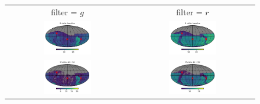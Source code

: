 \documentclass[preprintm,linenumbers]{aastex631}
\begin{document}
\begin{figure}
   		\centering
			\begin{tabular}{c c}
          filter = $g$ &  filter = $r$\\
   		\includegraphics[width=0.4\textwidth]{results/skymaps_cutout/skymaps_cutout_first_year_one_snap_v4_0_10yrs_db_noDD_noTwi_nside-256_CountMetric_g_noDD_noTwi.pdf} &
   		\includegraphics[width=0.4\textwidth]{results/skymaps_cutout/skymaps_cutout_first_year_one_snap_v4_0_10yrs_db_noDD_noTwi_nside-256_CountMetric_r_noDD_noTwi.pdf} \\

         \includegraphics[width=0.4\textwidth]{results/skymaps_cutout/skymaps_cutout_first_year_one_snap_v4_0_10yrs_db_noDD_noTwi_tscale-3_nside-256_doAllTemplateMetrics_reduceCount_g_noDD_noTwi.pdf} &
         \includegraphics[width=0.4\textwidth]{results/skymaps_cutout/skymaps_cutout_first_year_one_snap_v4_0_10yrs_db_noDD_noTwi_tscale-3_nside-256_doAllTemplateMetrics_reduceCount_r_noDD_noTwi.pdf} \\


\end{tabular}
\end{figure}
\end{document}
